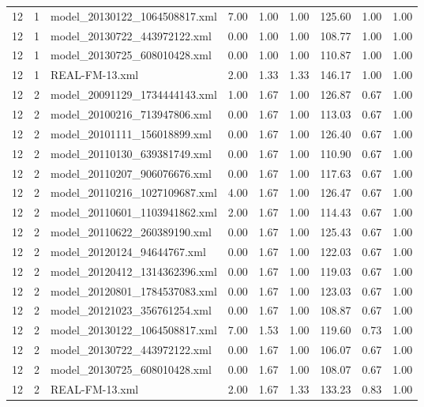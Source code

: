 \begin{table}[ht]
\begin{tabular}{rrlrrrrrr}
   12 &   1 & model\_20130122\_1064508817.xml & 7.00 & 1.00 & 1.00 & 125.60 & 1.00 & 1.00 \\ 
   12 &   1 & model\_20130722\_443972122.xml & 0.00 & 1.00 & 1.00 & 108.77 & 1.00 & 1.00 \\ 
   12 &   1 & model\_20130725\_608010428.xml & 0.00 & 1.00 & 1.00 & 110.87 & 1.00 & 1.00 \\ 
   12 &   1 & REAL-FM-13.xml & 2.00 & 1.33 & 1.33 & 146.17 & 1.00 & 1.00 \\ 
   12 &   2 & model\_20091129\_1734444143.xml & 1.00 & 1.67 & 1.00 & 126.87 & 0.67 & 1.00 \\ 
   12 &   2 & model\_20100216\_713947806.xml & 0.00 & 1.67 & 1.00 & 113.03 & 0.67 & 1.00 \\ 
   12 &   2 & model\_20101111\_156018899.xml & 0.00 & 1.67 & 1.00 & 126.40 & 0.67 & 1.00 \\ 
   12 &   2 & model\_20110130\_639381749.xml & 0.00 & 1.67 & 1.00 & 110.90 & 0.67 & 1.00 \\ 
   12 &   2 & model\_20110207\_906076676.xml & 0.00 & 1.67 & 1.00 & 117.63 & 0.67 & 1.00 \\ 
   12 &   2 & model\_20110216\_1027109687.xml & 4.00 & 1.67 & 1.00 & 126.47 & 0.67 & 1.00 \\ 
   12 &   2 & model\_20110601\_1103941862.xml & 2.00 & 1.67 & 1.00 & 114.43 & 0.67 & 1.00 \\ 
   12 &   2 & model\_20110622\_260389190.xml & 0.00 & 1.67 & 1.00 & 125.43 & 0.67 & 1.00 \\ 
   12 &   2 & model\_20120124\_94644767.xml & 0.00 & 1.67 & 1.00 & 122.03 & 0.67 & 1.00 \\ 
   12 &   2 & model\_20120412\_1314362396.xml & 0.00 & 1.67 & 1.00 & 119.03 & 0.67 & 1.00 \\ 
   12 &   2 & model\_20120801\_1784537083.xml & 0.00 & 1.67 & 1.00 & 123.03 & 0.67 & 1.00 \\ 
   12 &   2 & model\_20121023\_356761254.xml & 0.00 & 1.67 & 1.00 & 108.87 & 0.67 & 1.00 \\ 
   12 &   2 & model\_20130122\_1064508817.xml & 7.00 & 1.53 & 1.00 & 119.60 & 0.73 & 1.00 \\ 
   12 &   2 & model\_20130722\_443972122.xml & 0.00 & 1.67 & 1.00 & 106.07 & 0.67 & 1.00 \\ 
   12 &   2 & model\_20130725\_608010428.xml & 0.00 & 1.67 & 1.00 & 108.07 & 0.67 & 1.00 \\ 
   12 &   2 & REAL-FM-13.xml & 2.00 & 1.67 & 1.33 & 133.23 & 0.83 & 1.00 \\ 

\end{tabular}
\end{table}
